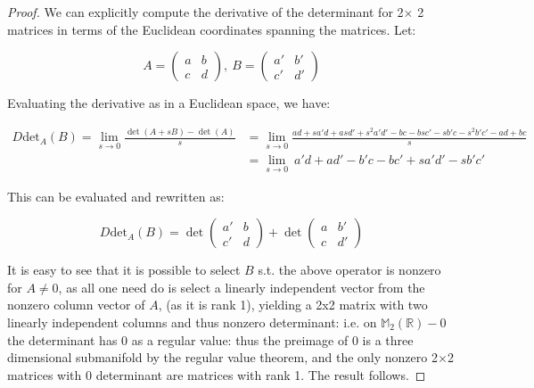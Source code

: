 \documentclass{article}
\begin{document}
\begin{proof}
  We can explicitly compute the derivative of the determinant for 2$\times$ 2 matrices in terms of the Euclidean coordinates spanning the matrices. Let:

  \[
    A = \begin{pmatrix} a & b \\ c & d \end{pmatrix}, \ B = \begin{pmatrix} a' & b' \\ c' & d' \end{pmatrix} 
  \]

  Evaluating the derivative as in a Euclidean space, we have:
  
  \begin{align*}
 D \text{det}_{A}(B) = \lim_{s \to 0}\frac{\det(A+sB) - \det(A)}{s} & = \lim_{s\to 0} \frac{ad + sa'd + asd' + s^{2}a'd' - bc - bsc' - sb'c - s^{2}b'c' -ad + bc}{s} \\ & = \lim_{s\to 0} \ a'd + ad' - b'c - bc' + sa'd' - sb'c'
\end{align*}

This can be evaluated and rewritten as:

\[
D \text{det}_{A}(B) = \det \begin{pmatrix} a' & b \\ c' & d \end{pmatrix} + \det \begin{pmatrix} a & b' \\ c & d' \end{pmatrix}
\]

It is easy to see that it is possible to select $B$ s.t. the above operator is nonzero for $A \neq 0$, as all one need do is select a linearly independent vector from the nonzero column vector of $A$, (as it is rank 1), yielding a 2x2 matrix with two linearly independent columns and thus nonzero determinant: i.e. on $\mathbb{M}_{2}(\mathbb{R}) - 0$ the determinant has $0$ as a regular value: thus the preimage of 0 is a three dimensional submanifold by the regular value theorem, and the only nonzero 2$\times$2 matrices with 0 determinant are matrices with rank 1. The result follows. 
\end{proof}
\end{document}
